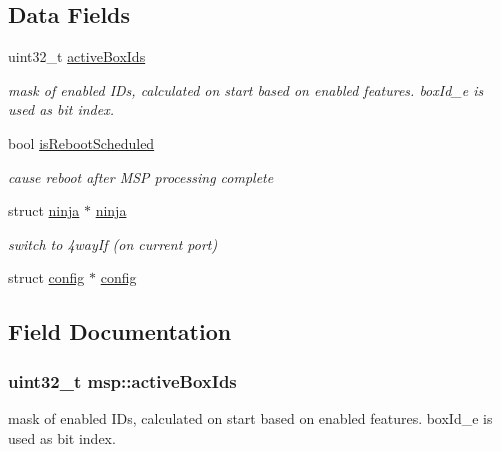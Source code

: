 \subsection*{Data Fields}
\begin{DoxyCompactItemize}
\item 
uint32\+\_\+t \hyperlink{structmsp_a5460e81255b79ad8b6dbcaff75b66704}{active\+Box\+Ids}
\begin{DoxyCompactList}\small\item\em mask of enabled I\+Ds, calculated on start based on enabled features. box\+Id\+\_\+e is used as bit index. \end{DoxyCompactList}\item 
bool \hyperlink{structmsp_adadce01cb42b5adb014145212121a7bd}{is\+Reboot\+Scheduled}
\begin{DoxyCompactList}\small\item\em cause reboot after M\+S\+P processing complete \end{DoxyCompactList}\item 
struct \hyperlink{structninja}{ninja} $\ast$ \hyperlink{structmsp_a003349a30290f00d554415f1b3ea456e}{ninja}
\begin{DoxyCompactList}\small\item\em switch to 4way\+If (on current port) \end{DoxyCompactList}\item 
struct \hyperlink{structconfig}{config} $\ast$ \hyperlink{structmsp_a3169ee8fa0ac315bd714ad444f2ed3b2}{config}
\end{DoxyCompactItemize}


\subsection{Field Documentation}
\hypertarget{structmsp_a5460e81255b79ad8b6dbcaff75b66704}{
\subsubsection[{active\+Box\+Ids}]{\setlength{\rightskip}{0pt plus 5cm}uint32\+\_\+t msp\+::active\+Box\+Ids}}\label{structmsp_a5460e81255b79ad8b6dbcaff75b66704}


mask of enabled I\+Ds, calculated on start based on enabled features. box\+Id\+\_\+e is used as bit index. 

